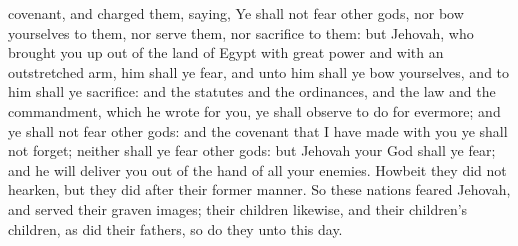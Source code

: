 covenant, and charged them, saying, Ye shall not fear other gods, nor bow yourselves to them, nor serve them, nor sacrifice to them: but Jehovah, who brought you up out of the land of Egypt with great power and with an outstretched arm, him shall ye fear, and unto him shall ye bow yourselves, and to him shall ye sacrifice: and the statutes and the ordinances, and the law and the commandment, which he wrote for you, ye shall observe to do for evermore; and ye shall not fear other gods: and the covenant that I have made with you ye shall not forget; neither shall ye fear other gods: but Jehovah your God shall ye fear; and he will deliver you out of the hand of all your enemies. Howbeit they did not hearken, but they did after their former manner. So these nations feared Jehovah, and served their graven images; their children likewise, and their children’s children, as did their fathers, so do they unto this day. 

